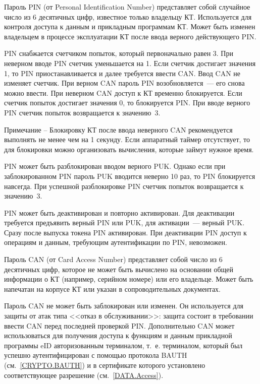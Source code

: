 Пароль PIN (от Personal Identification Number)
представляет собой случайное число из 6 десятичных цифр,
известное только владельцу КТ. Используется для контроля доступа к данным и 
прикладным программам КТ. Может быть изменен владельцем в процессе
эксплуатации КТ после ввода верного действующего PIN.

PIN снабжается счетчиком попыток, который первоначально равен 3. При 
неверном вводе PIN счетчик уменьшается на 1. Если счетчик достигает 
значения 1, то PIN приостанавливается и далее требуется ввести CAN. 
Ввод CAN не изменяет счетчик. При верном CAN пароль PIN возобновляется~--- 
его снова можно ввести. При неверном CAN доступ к КТ временно блокируется. 
Если счетчик попыток достигает значения 0, то блокируется PIN. 
%
При вводе верного PIN счетчик попыток возвращается к значению~$3$.

\vskip6pt

\begin{note}
Примечание -- Блокировку КТ после ввода неверного CAN рекомендуется выполнять 
не менее чем на 1 секунду. Если аппаратный таймер отсутствует, то для 
блокировки можно организовать вычисления, которые займут нужное время. 
\end{note}

\vskip6pt

PIN может быть разблокирован вводом верного PUK. Однако если при заблокированном
PIN пароль PUK вводится неверно 10 раз, то PIN блокируется навсегда.
%
При успешной разблокировке PIN счетчик попыток возвращается к значению~$3$. 

PIN может быть деактивирован и повторно активирован.
Для деактивации требуется предъявить верный PIN или PUK, 
для активации~--- верный PUK. Сразу после выпуска токена PIN активирован. 
При деактивации PIN доступ к операциям и данным, требующим аутентификации по 
PIN, невозможен.

Пароль CAN (от Card Access Number) представляет собой число из 6 десятичных 
цифр, которое не может быть вычислено на основании общей информации о КТ 
(например, серийном номере) или его владельце. Может быть напечатан на корпусе 
КТ или указан в сопроводительных документах. 

Пароль CAN не может быть заблокирован или изменен. Он используется для защиты 
от атак типа <<отказ в обслуживании>>: защита состоит в требовании ввести CAN перед 
последней проверкой PIN. Дополнительно CAN может использоваться для 
получения доступа к функциям и данным прикладной программы eID 
авторизованным терминалом, т.~е. терминалом, который был успешно 
аутентифицирован с помощью протокола BAUTH (см.~\ref{CRYPTO.BAUTH}) и в 
сертификате которого установлено соответствующее разрешение (см.~\ref{DATA.Access}). 

